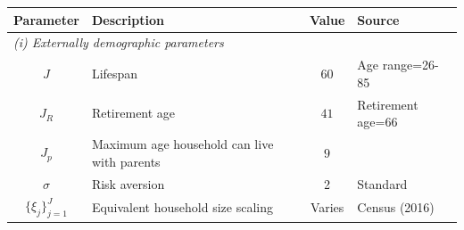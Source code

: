 \begin{table}[p]
\footnotesize
\renewcommand{\arraystretch}{1.2}
\begin{center}
\begin{tabular}{clcl}\toprule
Parameter & Description & Value & Source\\
\midrule
\multicolumn{4}{l}{\textit{(i) Externally demographic parameters}}\\
\midrule
$J$ & Lifespan & $60$ & Age range=26-85 \\
$J_{R}$ & Retirement age & $41$  & Retirement age=66 \\
$J_{p}$ & Maximum age household can live with parents & $9$ & \citet{rs-2023} \\
$\sigma$ & Risk aversion & 2 & Standard\\
$\{\xi_j\}_{j=1}^{J}$ & Equivalent household size scaling & Varies & Census (2016)\\
\bottomrule
\bottomrule
\end{tabular}
\end{center}
\normalsize
\end{table}
